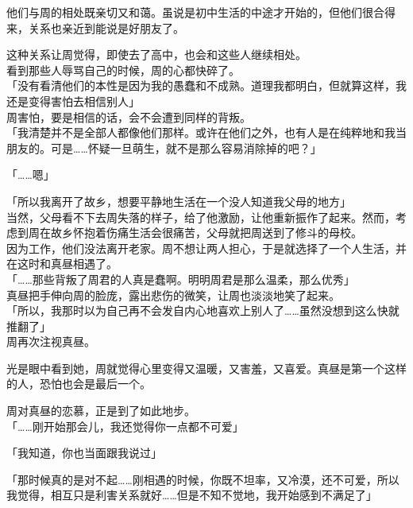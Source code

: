 他们与周的相处既亲切又和蔼。虽说是初中生活的中途才开始的，但他们很合得来，关系也亲近到能说是好朋友了。

这种关系让周觉得，即使去了高中，也会和这些人继续相处。\\

看到那些人辱骂自己的时候，周的心都快碎了。\\

「没有看清他们的本性是因为我的愚蠢和不成熟。道理我都明白，但就算这样，我还是变得害怕去相信别人」\\

周害怕，要是相信的话，会不会遭到同样的背叛。\\

「我清楚并不是全部人都像他们那样。或许在他们之外，也有人是在纯粹地和我当朋友的。可是……怀疑一旦萌生，就不是那么容易消除掉的吧？」

「……嗯」

「所以我离开了故乡，想要平静地生活在一个没人知道我父母的地方」\\

当然，父母看不下去周失落的样子，给了他激励，让他重新振作了起来。然而，考虑到周在故乡怀抱着伤痛生活会很痛苦，父母就把周送到了修斗的母校。\\

因为工作，他们没法离开老家。周不想让两人担心，于是就选择了一个人生活，并在这时和真昼相遇了。\\

「……那些背叛了周君的人真是蠢啊。明明周君是那么温柔，那么优秀」\\

真昼把手伸向周的脸庞，露出悲伤的微笑，让周也淡淡地笑了起来。\\

「所以，我那时以为自己再不会发自内心地喜欢上别人了……虽然没想到这么快就推翻了」\\

周再次注视真昼。

光是眼中看到她，周就觉得心里变得又温暖，又害羞，又喜爱。真昼是第一个这样的人，恐怕也会是最后一个。

周对真昼的恋慕，正是到了如此地步。\\

「……刚开始那会儿，我还觉得你一点都不可爱」

「我知道，你也当面跟我说过」

「那时候真的是对不起……刚相遇的时候，你既不坦率，又冷漠，还不可爱，所以我觉得，相互只是利害关系就好……但是不知不觉地，我开始感到不满足了」\\

